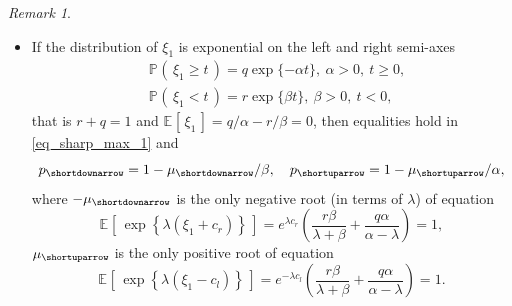 \documentclass{article}
\makeatletter
\theoremstyle{plain}
\theoremstyle{definition}
\theoremstyle{remark}
\newtheorem{remark}[theorem]{Remark}
\newcommand{\p}[2][]{{\mathbb{P}}_{#1} \left( \, #2 \, \right) } %
\newcommand{\e}[2][]{{\mathbb{E}_{#1}\left[ \, #2 \,\right] }} %
\def\namedlabel#1#2{\begingroup
    #2%
    \def\@currentlabel{#2}%
    \phantomsection\label{#1}\endgroup
}
\makeatother
\begin{document}
\begin{remark}
\begin{itemize}
\item[\namedlabel{rk_sm_iii}{$(ii)$}] If the distribution of $\xi_1$ is exponential on the left and right semi-axes 
    \begin{equation*}
\begin{split}
& \p{\xi_1 \geqslant t}=q\exp\{-\alpha t\}, \ \alpha>0, \ t\geqslant 0, \\ 
& \p{\xi_1<t}=r\exp\{\beta t\},\  \beta>0,\  t<0,
 \end{split}
\end{equation*}
that is $r+q=1$ and $ \e{\xi_1}=q/\alpha-r/\beta=0$, then equalities hold in \eqref{eq_sharp_max_1} and
\begin{equation}\label{eq_sharp_max_5}
p_{\shortdownarrow}= 1-\mu_{\shortdownarrow} / \beta, \quad p_{\shortuparrow}=1-\mu_{\shortuparrow} / \alpha,
\end{equation}
where $-\mu_{\shortdownarrow} $ is the only negative root (in terms of $\lambda$) of equation $$\e{\exp \left\{\lambda (\xi_1 + c_r)\right\}}=e^{\lambda c_r}\left(\frac{r \beta}{\lambda+\beta}+\frac{q \alpha}{\alpha-\lambda}\right)=1,$$  $\mu_{\shortuparrow} $ is the only positive root of equation  $$\e{\exp \left\{\lambda (\xi_1 - c_l)\right\}}=e^{-\lambda c_l}\left(\frac{r \beta}{\lambda+\beta}+\frac{q \alpha}{\alpha-\lambda}\right)=1.$$
\end{itemize}
\end{remark}
\end{document}
